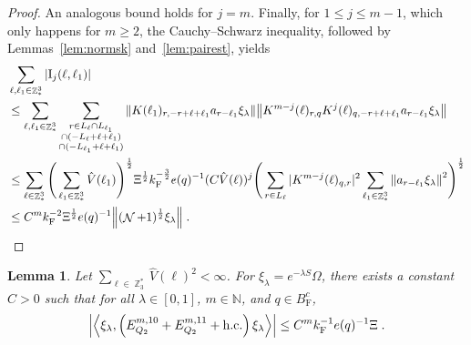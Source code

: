 \documentclass[12pt,a4paper]{article}
\numberwithin{equation}{section}
\newcommand{\NNN}{\mathbb{N}}
\newcommand{\1}{\mathbb{I}}
\newcommand{\F}{\mathrm{F}}
\newcommand{\I}{\mathrm{I}}
\DeclareMathOperator{\Z}{\mathbb{Z}}
\DeclareMathOperator{\NN}{\mathcal{N}}
\newcommand{\half}{\frac{1}{2}}
\newcommand{\eva}[1]{\left\langle #1 \right\rangle}
\theoremstyle{plain}
\newtheorem{lemma}[theorem]{Lemma}
\theoremstyle{definition}
\theoremstyle{remark}
\theoremstyle{plain}
\theoremstyle{definition}
\theoremstyle{remark}
\begin{document}
\begin{proof}
{}
An analogous bound holds for $ j = m $. Finally, for $ 1 \le j \le m-1 $, which only happens for $ m \ge 2 $, the Cauchy--Schwarz inequality, followed by Lemmas~\ref{lem:normsk} and~\ref{lem:pairest}, yields
\textcolor{green!30!black}{
\begin{align}
	&\sum_{\ell,\ell_1 \in \Z^3_*}|\I_j(\ell, \ell_1)| \nonumber\\
	&\leq \sum_{\ell,\ell_1 \in \Z^3_*} \sum\limits_{\substack{r\in L_{\ell} \cap L_{\ell_1}\\\cap (-L_{\ell}+\ell+\ell_1) \\ \cap (-L_{\ell_1}+\ell+\ell_1)}} \norm{ K(\ell_1)_{r,-r+\ell+\ell_1} a_{r-\ell_1} \xi_\lambda} \norm{ K^{m-j}(\ell)_{r,q} K^j(\ell)_{q,-r+\ell+\ell_1} a_{r-\ell_1} \xi_\lambda} \nonumber\\
	&\leq \sum_{\ell \in \Z^3_*}
		\Bigg( \sum_{\ell_1 \in \Z^3_*} \hat{V}(\ell_1) \Bigg)^{\half}
		\Xi^{\half} k_{\F}^{-\frac 32} e(q)^{-1} (C \hat{V}(\ell))^j
		\Bigg( \sum_{r \in L_{\ell}} |K^{m-j}(\ell)_{q,r}|^2 
		\sum_{\ell_1 \in \Z^3_*} \norm{a_{r-\ell_1} \xi_\lambda}^2 \Bigg)^{\half} \nonumber\\
	&\leq C^m k_{\F}^{-2} \Xi^{\half} e(q)^{-1} \norm{(\NN+1)^{\half} \xi_\lambda} \;. \label{eq:estEQ2182}
\end{align}
}
\end{proof}


\begin{lemma} \label{lem:EQ212}
Let $ \sum_{\ell \in \Z_3^*} \hat{V}(\ell)^2 < \infty $. For $\xi_\lambda = e^{-\lambda S} \Omega$, there exists a constant $ C > 0 $ such that for all $ \lambda \in [0,1] $, $ m \in \NNN $, and $ q \in B_{\F}^c $,
\begin{equation}
	\abs{\eva{\xi_\lambda,\left(E^{m,10}_{Q_2}+E^{m,11}_{Q_2}+\mathrm{h.c.}\right) \xi_\lambda }}
	\leq C^m k_{\F}^{-1} e(q)^{-1} \Xi \;. \label{eq:estEQ212}
\end{equation}
\end{lemma}
\end{document}
